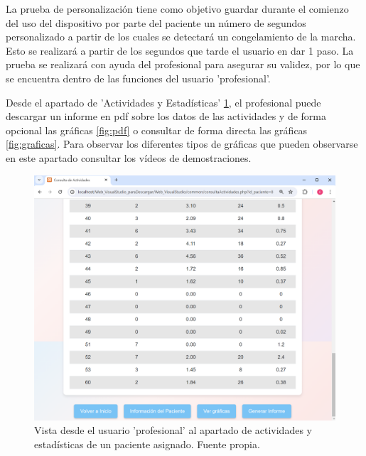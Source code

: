 La prueba de personalización tiene como objetivo guardar durante el comienzo del uso del dispositivo por parte del paciente un número de segundos personalizado a partir de los cuales se detectará un congelamiento de la marcha. Esto se realizará a partir de los segundos que tarde el usuario en dar 1 paso. La prueba se realizará con ayuda del profesional para asegurar su validez, por lo que se encuentra dentro de las funciones del usuario 'profesional'.

Desde el apartado de 'Actividades y Estadísticas' \ref{fig:profestadisticas}, el profesional puede descargar un informe en pdf sobre los datos de las actividades y de forma opcional las gráficas \ref{fig:pdf} o consultar de forma directa las gráficas \ref{fig:graficas}. Para observar los diferentes tipos de gráficas que pueden observarse en este apartado consultar los vídeos de demostraciones.

\begin{figure}[h]
    \centering
    \includegraphics[width=1\textwidth]{img/profestadisticas.png}
    \caption{Vista desde el usuario 'profesional' al apartado de actividades y estadísticas de un paciente asignado. Fuente propia.}
    \label{fig:profestadisticas}
\end{figure}



